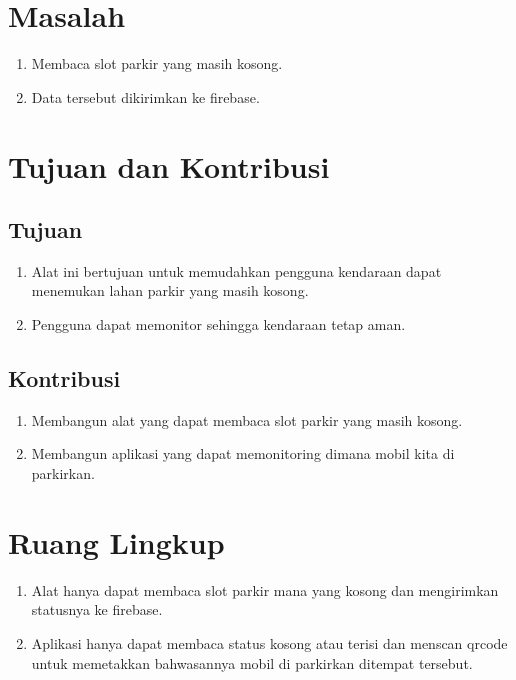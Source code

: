 \section{Masalah}
\begin{enumerate}
	\item Membaca slot parkir yang masih kosong.
	\item Data tersebut dikirimkan ke firebase.
\end{enumerate}


\section{Tujuan dan Kontribusi}
\subsection{Tujuan}
\begin{enumerate}
	\item Alat ini bertujuan untuk memudahkan pengguna kendaraan dapat menemukan lahan parkir yang masih kosong.
	\item Pengguna dapat memonitor sehingga kendaraan tetap aman.
\end{enumerate}

\subsection{Kontribusi}
\begin{enumerate}
	\item Membangun alat yang dapat membaca slot parkir yang masih kosong.
	\item Membangun aplikasi yang dapat memonitoring dimana mobil kita di parkirkan.
\end{enumerate}

\section{Ruang Lingkup}
\begin{enumerate}
	\item Alat hanya dapat membaca slot parkir mana yang kosong dan mengirimkan statusnya ke firebase.
	\item Aplikasi hanya dapat membaca status kosong atau terisi dan menscan qrcode untuk memetakkan bahwasannya mobil di parkirkan ditempat tersebut.
\end{enumerate}
